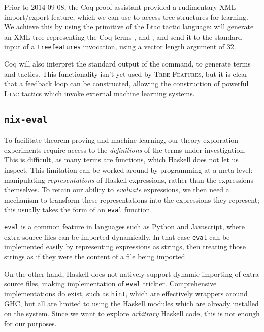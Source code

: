 \documentclass[]{article}
\begin{document}
Prior to 2014-09-08, the Coq proof assistant provided a rudimentary XML import/export feature, which we can use to access tree structures for learning. We achieve this by using the  primitive of the Ltac tactic language:  will generate an XML tree representing the Coq terms ,  and , and send it to the standard input of a \texttt{treefeatures} invocation, using a vector length argument of 32.

Coq will also interpret the standard output of the command, to generate terms and tactics. This functionality isn't yet used by \textsc{Tree Features}, but it is clear that a feedback loop can be constructed, allowing the construction of powerful \textsc{Ltac} tactics which invoke external machine learning systems.

\subsection{\texttt{nix-eval}}\label{nixeval}

To facilitate theorem proving and machine learning, our theory exploration experiments require access to the \emph{definitions} of the terms under investigation. This is difficult, as many terms are functions, which Haskell does not let us inspect. This limitation can be worked around by programming at a meta-level: manipulating \emph{representations} of Haskell expressions, rather than the expressions themselves. To retain our ability to \emph{evaluate} expressions, we then need a mechanism to transform these representations into the expressions they represent; this usually takes the form of an \texttt{eval} function.

\texttt{eval} is a common feature in languages such as Python and Javascript, where extra source files can be imported dynamically. In that case \texttt{eval} can be implemented easily by representing expressions as strings, then treating those strings as if they were the content of a file being imported.

On the other hand, Haskell does not natively support dynamic importing of extra source files, making implementation of \texttt{eval} trickier. Comprehensive implementations do exist, such as \texttt{hint}, which are effectively wrappers around GHC, but all are limited to using the Haskell modules which are already installed on the system. Since we want to explore \emph{arbitrary} Haskell code, this is not enough for our purposes.
\end{document}
